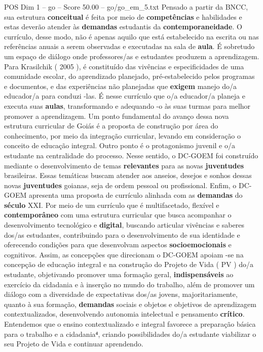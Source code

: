 \begin{textsample}{POS Dim 1 – go – Score 50.00 – go/go\_em\_5.txt}
Pensado a partir da BNCC, sua estrutura \textbf{conceitual} é feita por meio de \textbf{competências} e habilidades e estas deverão atender às \textbf{demandas} estudantis da \textbf{contemporaneidade}.
O currículo, desse modo, não é apenas aquilo que está estabelecido na escrita ou nas referências anuais a serem observadas e executadas na sala de \textbf{aula}.
É sobretudo um espaço de diálogo onde professores/as e estudantes produzem a aprendizagem.
Para Krasilchik ( 2005 ), é constituído das vivências e especificidades de uma comunidade escolar, do aprendizado planejado, pré-estabelecido pelos programas e documentos, e das experiências não planejadas que \textbf{exigem} manejo do/a educador/a para conduzi -las.
É nesse currículo que o/a educador/a planeja e executa suas \textbf{aulas}, transformando e adequando -o às suas turmas para melhor promover a aprendizagem.
Um ponto fundamental do avanço dessa nova estrutura curricular de Goiás é a proposta de construção por área do conhecimento, por meio da integração curricular, levando em consideração o conceito de educação integral.
Outro ponto é o protagonismo juvenil e o/a estudante na centralidade do processo.
Nesse sentido, o DC-GOEM foi construído mediante o desenvolvimento de temas \textbf{relevantes} para as novas \textbf{juventudes} brasileiras.
Essas temáticas buscam atender aos anseios, desejos e sonhos dessas novas \textbf{juventudes} goianas, seja de ordem pessoal ou profissional.
Enfim, o DC-GOEM apresenta uma proposta de currículo alinhada com as \textbf{demandas} do \textbf{século} XXI.
Por meio de um currículo que é multifacetado, flexível e \textbf{contemporâneo} com uma estrutura curricular que busca acompanhar o desenvolvimento tecnológico e \textbf{digital}, buscando articular vivências e saberes dos/as estudantes, contribuindo para o desenvolvimento de sua identidade e oferecendo condições para que desenvolvam aspectos \textbf{socioemocionais} e cognitivos.
Assim, as concepções que direcionam o DC-GOEM apoiam -se na concepção de educação integral e na construção do Projeto de Vida ( PV ) do/a estudante, objetivando promover uma formação geral, \textbf{indispensáveis} ao exercício da cidadania e à inserção no mundo do trabalho, além de promover um diálogo com a diversidade de expectativas dos/as jovens, majoritariamente, quanto à sua formação, \textbf{demandas} sociais e objetos e objetivos de aprendizagem contextualizados, desenvolvendo autonomia intelectual e pensamento \textbf{crítico}.
Entendemos que o ensino contextualizado e integral favorece a preparação básica para o trabalho e a cidadania⁴, criando possibilidades do/a estudante viabilizar o seu Projeto de Vida e continuar aprendendo.

\end{textsample}
